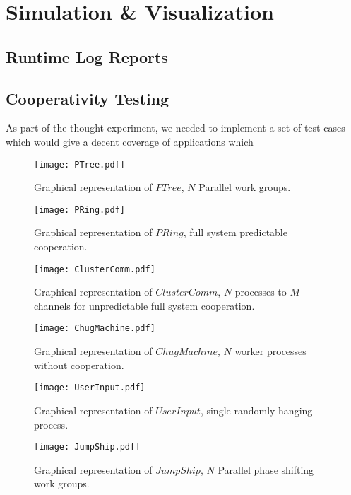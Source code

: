 \section{Simulation \& Visualization}\label{sec:simulation and visualization}

\subsection{Runtime Log Reports}\label{sec:runtime log reports}
\subsection{Cooperativity Testing}\label{sec:cooperativity testing}

As part of the thought experiment, we needed to implement a set of test cases 
which would give a decent coverage of applications which 

\begin{figure}
\centering
\texttt{[image: PTree.pdf]}
\caption{Graphical representation of $PTree$, $N$ Parallel work groups.}
\label{fig:PTree}
\end{figure}

\begin{figure}
\centering
\texttt{[image: PRing.pdf]}
\caption{Graphical representation of $PRing$, full system predictable 
cooperation.}
\label{fig:PRing}
\end{figure}

\begin{figure}
\centering
\texttt{[image: ClusterComm.pdf]}
\caption{Graphical representation of $ClusterComm$, $N$ processes to $M$ 
channels for unpredictable full system cooperation.}
\label{fig:ClusterComm}
\end{figure}

\begin{figure}
\centering
\texttt{[image: ChugMachine.pdf]}
\caption{Graphical representation of $ChugMachine$, $N$ worker processes 
without cooperation.}
\label{fig:}
\end{figure}

\begin{figure}
\centering
\texttt{[image: UserInput.pdf]}
\caption{Graphical representation of $UserInput$, single randomly hanging 
process.}
\label{fig:}
\end{figure}

\begin{figure}
\centering
\texttt{[image: JumpShip.pdf]}
\caption{Graphical representation of $JumpShip$, $N$ Parallel phase shifting 
work groups.}
\label{fig:JumpShip}
\end{figure}





